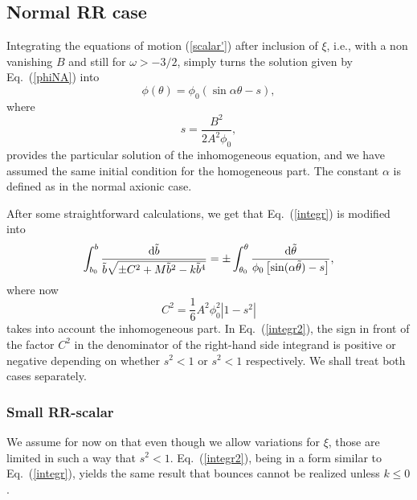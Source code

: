 \documentclass[a4paper,aps,twocolumn,prd,showpacs,nofootinbib]{revtex4}
\newcommand{\dd}{\mathrm{d}}
\begin{document}
\subsection{Normal RR case}

Integrating the equations of motion (\ref{scalar'}) after inclusion of
$\xi$, i.e., with a non vanishing $B$ and still for $\omega > -3/2$,
simply turns the solution given by Eq.~(\ref{phiNA}) into
\begin{equation}
\phi(\theta) = \phi_0\left(\sin\alpha\theta - s\right),
\end{equation}
where
\begin{equation}
s = \frac{B^2}{2A^2\phi_0},
\end{equation}
provides the particular solution of the inhomogeneous equation, and we
have assumed the same initial condition for the homogeneous part. The
constant $\alpha$ is defined as in the normal axionic case.

After some straightforward calculations, we get that
Eq.~(\ref{integr}) is modified into
\begin{equation}
\int_{b_0}^{b} {\dd \tilde b \over \tilde b \sqrt{\pm C^2 + M \tilde
b^2 - k \tilde b^4}} = \pm \int_{\theta_0}^\theta {\dd \tilde
\theta\over \phi_0 \left[\sin(\alpha\tilde\theta)-s\right]},
\label{integr2}
\end{equation}
where now
\begin{equation}
C^2 = \frac{1}{6}A^2\phi_0^2 |1 - s^2| \label{Cs}
\end{equation}
takes into account the inhomogeneous part. In Eq.~(\ref{integr2}), the
sign in front of the factor $C^2$ in the denominator of the right-hand
side integrand is positive or negative depending on whether $s^2<1$ or
$s^2<1$ respectively. We shall treat both cases separately.

\subsubsection{Small RR-scalar}

We assume for now on that even though we allow variations for $\xi$,
those are limited in such a way that $s^2 <1$. Eq.~(\ref{integr2}),
being in a form similar to Eq.~(\ref{integr}), yields the same result
that bounces cannot be realized unless $k\leq 0$.
\end{document}
